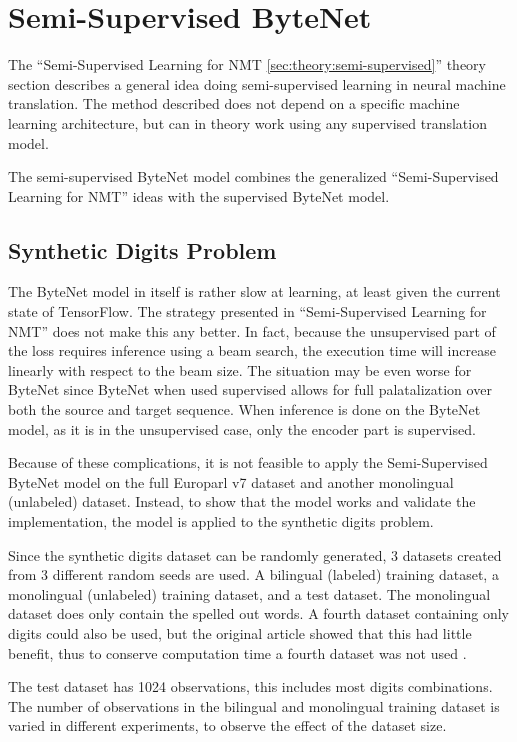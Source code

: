 
\section{Semi-Supervised ByteNet}

The ``Semi-Supervised Learning for NMT \ref{sec:theory:semi-supervised}'' theory section describes a general idea doing semi-supervised learning in neural machine translation. The method described does not depend on a specific machine learning architecture, but can in theory work using any supervised translation model.

The semi-supervised ByteNet model combines the generalized ``Semi-Supervised Learning for NMT'' ideas with the supervised ByteNet model.

\subsection{Synthetic Digits Problem}

The ByteNet model in itself is rather slow at learning, at least given the current state of TensorFlow. The strategy presented in ``Semi-Supervised Learning for NMT'' does not make this any better. In fact, because the unsupervised part of the loss requires inference using a beam search, the execution time will increase linearly with respect to the beam size. The situation may be even worse for ByteNet since ByteNet when used supervised allows for full palatalization over both the source and target sequence. When inference is done on the ByteNet model, as it is in the unsupervised case, only the encoder part is supervised.

Because of these complications, it is not feasible to apply the Semi-Supervised ByteNet model on the full Europarl v7 dataset and another monolingual (unlabeled) dataset. Instead, to show that the model works and validate the implementation, the model is applied to the synthetic digits problem.

Since the synthetic digits dataset can be randomly generated, 3 datasets created from 3 different random seeds are used. A bilingual (labeled) training dataset, a monolingual (unlabeled) training dataset, and a test dataset. The monolingual dataset does only contain the spelled out words. A fourth dataset containing only digits could also be used, but the original article showed that this had little benefit, thus to conserve computation time a fourth dataset was not used \cite{semi-supervised}.

The test dataset has 1024 observations, this includes most digits combinations. The number of observations in the bilingual and monolingual training dataset is varied in different experiments, to observe the effect of the dataset size.

